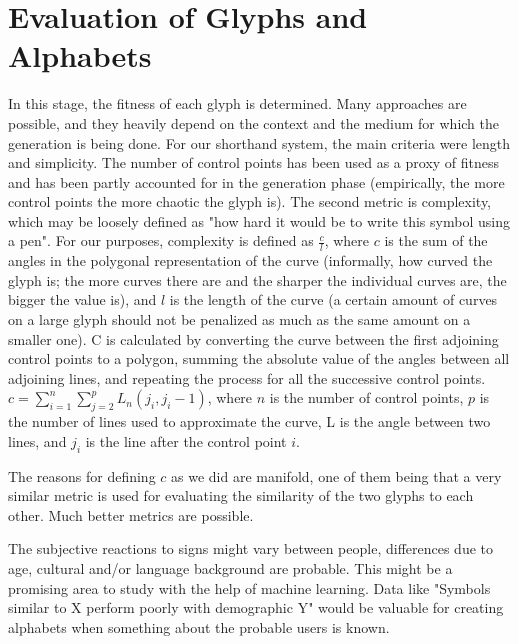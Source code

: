\documentclass[conference]{IEEEtran}
\begin{document}
\balance

\section{Evaluation of Glyphs and Alphabets}
In this stage, the fitness of each glyph is determined. Many approaches are possible, and they heavily depend on the context and the medium for which the generation is being done. For our shorthand system, the main criteria were length and simplicity. The number of control points has been used as a proxy of fitness and has been partly accounted for in the generation phase (empirically, the more control points the more chaotic the glyph is). The second metric is complexity, which may be loosely
defined as "how hard it would be to write this symbol using a pen". For our purposes, complexity is defined as \(\frac{c}{l}\), where \(c\) is the sum of the angles in the polygonal representation of the curve (informally, how curved the glyph is; the more curves there are and the sharper the individual curves are, the bigger the value is), and \(l\) is the length of the curve (a certain amount of curves on a large glyph should not be penalized as much as the same amount on a smaller one). C is calculated by converting the curve between the first adjoining control points to a polygon, summing the absolute value of the angles between all adjoining lines, and repeating the process for all the successive control points.
\(c=\sum_{i=1}^n\sum_{j=2}^{p}L_n(j_i, j_i-1)\), where \(n\) is the number of control points,  \(p\) is the number of lines used to approximate the curve, L is the angle between two lines,  and \(j_i\) is the line after the control point \(i\). 

The reasons for defining \(c\) as we did are manifold, one of them being that a very similar metric is used for evaluating the similarity of the two glyphs to each other. Much better metrics are possible.

	The subjective reactions to signs might vary between people, differences due to age, cultural and/or language background are probable. This might be a promising area to study with the help of machine learning. Data like "Symbols similar to X perform poorly with demographic Y" would be valuable for creating alphabets when something about the probable users is known. 
\end{document}
